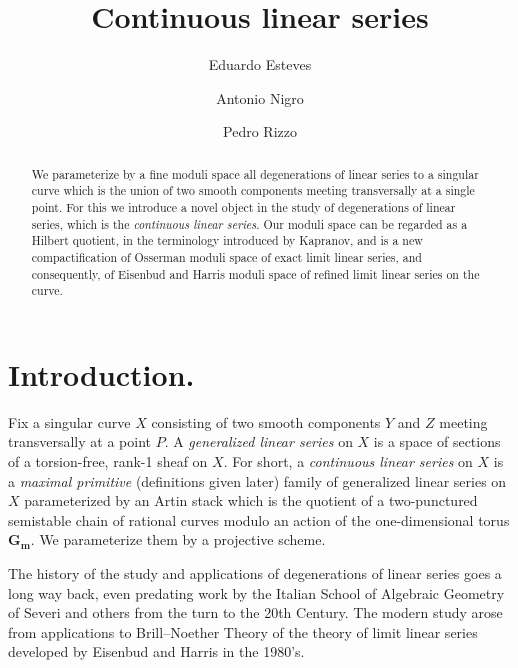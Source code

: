 \documentclass[a4paper,11pt]{amsart}
\title{Continuous linear series}
\author[Esteves]{Eduardo Esteves}
\author[Nigro]{Antonio Nigro}
\author[Rizzo]{Pedro  Rizzo}
\date{}
\theoremstyle{plain}
\theoremstyle{definition}
\theoremstyle{remark}
\def\cc{{\mathbf G}_{\mathbf m}}
\begin{document}
\begin{abstract}
We parameterize by a fine moduli space all degenerations of linear series to a singular curve which is the union of two smooth components meeting transversally at a single point. For this we introduce a novel object in the study of degenerations of linear series, which is the \emph{continuous linear series}. Our moduli space can be regarded as a Hilbert quotient, in the terminology introduced by Kapranov, and is a new compactification of Osserman moduli space of exact limit linear series, and consequently, of Eisenbud and Harris moduli space of refined limit linear series on the curve.
\end{abstract}
\maketitle

\section{Introduction.}
Fix a singular curve $X$ consisting of two smooth components $Y$ and $Z$ meeting transversally at a point $P$. A \emph{generalized linear series} on $X$ is a space of sections of a torsion-free, rank-1 sheaf on $X$. For short, a \emph{continuous linear series} on $X$ is a \emph{maximal primitive} (definitions given later) family of generalized linear series on $X$ parameterized by an Artin stack which is the quotient of a two-punctured semistable chain of rational curves modulo an action of the one-dimensional torus $\cc$. We parameterize them by a projective scheme. 

The history of the study and applications of degenerations of linear series goes a long way back, even predating work by the Italian School of Algebraic Geometry of Severi and others from the turn to the 20th Century. The modern study arose from applications to Brill--Noether Theory of the theory of limit linear series developed by Eisenbud and Harris in the 1980's. 
\end{document}
